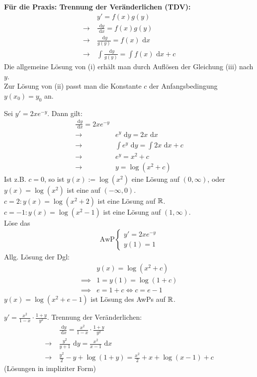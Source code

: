 \documentclass[a4paper,oneside,DIV15,BCOR12mm,chapterprefix=true,headings=onelinechapter]{scrbook}
\begin{document}
\textbf{Für die Praxis: Trennung der Veränderlichen (TDV):}\\
\begin{align*}
&y'=f(x)g(y)\\
\to\ &\frac{\text{ d}y}{\text{ d}x}=f(x)g(y)\\
\to\ &\frac{\text{ d}y}{g(y)}=f(x)\text{ d}x\\
\to\ &\int{\frac{\text{ d}y}{g(y)}}=\int f(x)\text{ d}x+c\tag{iii}
\end{align*}
Die allgemeine Lösung von (i) erhält man durch Auflösen der Gleichung (iii) nach $y$.\\
Zur Lösung von (ii) passt man die Konstante $c$ der Anfangsbedingung $y(x_0)=y_0$ an.

\begin{beispiele}
\item Sei $y'=2xe^{-y}$. Dann gilt:
\begin{align*}
\frac{\text{ d}y}{\text{ d}x}=2xe^{-y}\\
\to\ &e^y\text{ d}y = 2x\text{ d}x\\
\to\ &\int e^y\text{ d}y=\int 2x\text{ d}x+c\\
\to\ & e^y=x^2+c\\
\to\ &y=\log(x^2+c)
\end{align*}
Ist z.B. $c=0$, so ist $y(x):=\log(x^2)$ eine Lösung auf $(0,\infty)$, oder
$y(x)=\log(x^2)$ ist eine auf $(-\infty,0)$.\\
$c=2: y(x)=\log(x^2+2)$ ist eine Lösung auf $\mathbb{R}$.\\
$c=-1: y(x)=\log(x^2-1)$ ist eine Lösung auf $(1,\infty)$.\\
Löse das
\begin{align*}
\text{AwP}
\begin{cases}
y'=2xe^{-y}\\
y(1)=1
\end{cases}
\end{align*}
Allg. Lösung der Dgl:
\begin{align*}
&y(x)=\log(x^2+c)\\
\implies &1=y(1)=\log(1+c)\\
\implies &e=1+c \iff c=e-1
\end{align*}
$y(x)=\log(x^2+e-1)$ ist Lösung des AwPs auf $\mathbb{R}$.
\item $y'=\frac{x^2}{1-x}\cdot\frac{1+y}{y^2}$. Trennung der Veränderlichen:
\begin{align*}
&\frac{\text{ d}y}{\text{ d}x}=\frac{x^2}{1-x}\cdot\frac{1+y}{y^2}\\
\to\ &\frac{y^2}{y+1}\text{ d}y=\frac{x^2}{x-1}\text{ d}x\\
\to\ &\frac{y^2}2-y+\log(1+y)=\frac{x^2}2+x+\log(x-1)+c
\end{align*}
(Lösungen in impliziter Form)
\end{beispiele}
\end{document}
